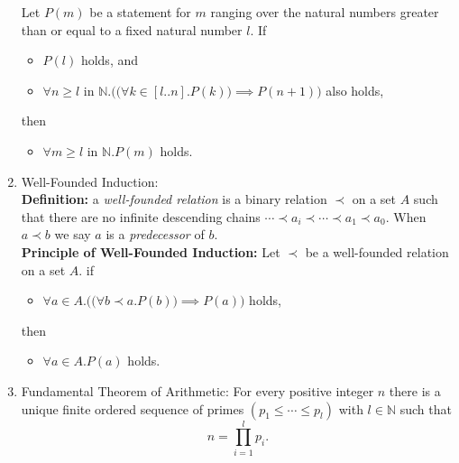 \documentclass{article}
\begin{document}
\begin{enumerate}
        Let $P(m)$ be a statement for $m$ ranging over the natural numbers greater than or equal to a fixed natural number $l$. If 
        \begin{itemize}[label={-},topsep=0pt]
            \item $P(l)$ holds, and 
            \item $\forall n\geq l\text{ in }\mathbb{N}.\Big(\big(\forall k\in[l..n].P(k)\big)\implies P(n+1)\Big)$ also holds,
        \end{itemize}
        then
        \begin{itemize}[label={-},topsep=0pt]
            \item $\forall m\geq l\text{ in }\mathbb{N}.P(m)$ holds.
        \end{itemize}
    \item Well-Founded Induction:\\
        \textbf{Definition:} a \textit{well-founded relation} is a binary relation $\prec$ on a set $A$ such that there are no infinite descending chains $\cdots\prec a_i\prec\cdots\prec a_1\prec a_0$. When $a\prec b$ we say $a$ is a \textit{predecessor} of $b$.\\
        \textbf{Principle of Well-Founded Induction:} Let $\prec$ be a well-founded relation on a set $A$. if
        \begin{itemize}[label={-},topsep=0pt]
            \item $\forall a\in A.\Big(\big(\forall b\prec a.P(b)\big)\implies P(a)\Big)$ holds,
        \end{itemize}
        then
        \begin{itemize}[label={-},topsep=0pt]
            \item $\forall a\in A.P(a)$ holds.
        \end{itemize}
    \item Fundamental Theorem of Arithmetic: For every positive integer $n$ there is a unique finite ordered sequence of primes $(p_1\leq\cdots\leq p_l)$ with $l\in\mathbb{N}$ such that
        $$n=\prod_{i=1}^{l}p_i.$$
\end{enumerate}
\newpage
\end{document}
